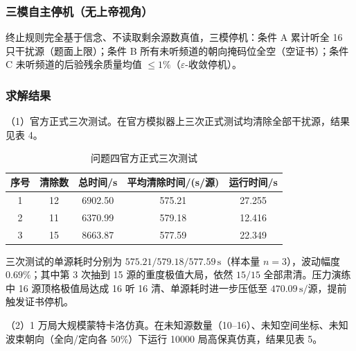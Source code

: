 \documentclass[12pt,a4paper]{article}
\begin{document}
\subsubsection{三模自主停机（无上帝视角）}
终止规则完全基于信念、不读取剩余源数真值，三模停机：条件 A 累计听全 16 只干扰源（题面上限）；条件 B 所有未听频道的朝向掩码位全空（空证书）；条件 C 未听频道的后验残余质量均值 $\le 1\%$（$\varepsilon$-收敛停机）。

\subsubsection{求解结果}
（1）官方正式三次测试。在官方模拟器上三次正式测试均清除全部干扰源，结果见表 4。

\begin{table}[H]
\centering
\caption{问题四官方正式三次测试}
\small
\begin{tabular}{@{}ccccc@{}}
\toprule
\textbf{序号} & \textbf{清除数} & \textbf{总时间/s} & \textbf{平均清除时间/(s/源)} & \textbf{运行时间/s} \\
\midrule
1 & 12 & 6902.50 & 575.21 & 27.255 \\
2 & 11 & 6370.99 & 579.18 & 12.416 \\
3 & 15 & 8663.87 & 577.59 & 22.349 \\
\bottomrule
\end{tabular}
\end{table}

三次测试的单源耗时分别为 $575.21/579.18/577.59\,\mathrm{s}$（样本量 $n=3$），波动幅度 $0.69\%$；其中第 3 次抽到 15 源的重度极值大局，依然 $15/15$ 全部肃清。压力演练中 16 源顶格极值局达成 16 听 16 清、单源耗时进一步压低至 $470.09\,\mathrm{s}/$源，提前触发证书停机。

（2）1 万局大规模蒙特卡洛仿真。在未知源数量（10--16）、未知空间坐标、未知波束朝向（全向/定向各 $50\%$）下运行 10000 局高保真仿真，结果见表 5。
\end{document}
